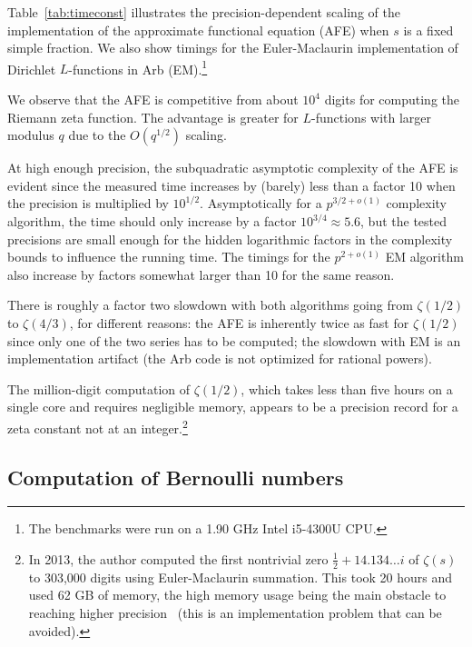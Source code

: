 \documentclass[reqno]{amsart}
\theoremstyle{definition}
\begin{document}
Table~\ref{tab:timeconst} illustrates the precision-dependent scaling
of the implementation of the approximate functional equation (AFE) when $s$ is a fixed simple fraction.
We also show timings for the Euler-Maclaurin implementation
of Dirichlet $L$-functions in Arb (EM).\footnote{The benchmarks were run on a 1.90 GHz Intel i5-4300U CPU.}

We observe that the AFE
is competitive from about $10^4$ digits for computing the Riemann zeta function.
The advantage is greater for $L$-functions with
larger modulus $q$ due to the $O(q^{1/2})$ scaling.

At high enough precision, the subquadratic asymptotic complexity
of the AFE is evident
since the measured time increases by (barely) less than a factor 10
when the precision is multiplied by $10^{1/2}$.
Asymptotically for a $p^{3/2+o(1)}$ complexity algorithm,
the time should only increase by
a factor $10^{3/4} \approx 5.6$,
but the tested precisions are small enough
for the hidden logarithmic factors in the complexity bounds
to influence the running time.
The timings for the $p^{2+o(1)}$ EM
algorithm also increase by factors somewhat larger than 10
for the same reason.

There is roughly a factor two slowdown with both algorithms
going from $\zeta(1/2)$ to $\zeta(4/3)$, for different reasons: the AFE is inherently twice
as fast for $\zeta(1/2)$ since only one of the two series has to be computed;
the slowdown with EM is an implementation artifact
(the Arb code is not optimized for rational powers).

The million-digit computation of $\zeta(1/2)$, which takes less than five hours
on a single core and requires negligible memory,
appears to be a precision record for a zeta constant not at an integer.\footnote{In 2013, the author computed the
first nontrivial zero $\tfrac{1}{2} + 14.134\ldots i$ of $\zeta(s)$ to
303,000 digits using Euler-Maclaurin summation. This took 20 hours and used 62 GB of memory,
the high memory usage being the main obstacle to reaching higher precision~\cite{Johansson2014hurwitz} (this
is an implementation problem that can be avoided).}







\subsection{Computation of Bernoulli numbers}
\end{document}
